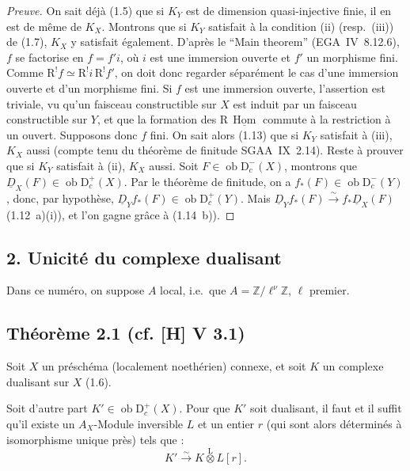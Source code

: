 \documentclass[11pt]{article}
\DeclareMathOperator{\Hom}{Hom}
\newcommand{\R}{\mathrm{R}}\newcommand{\RHomCore}{\mathrm{RHom}}
\newcommand{\D}{\mathrm{D}}
\newcommand{\Z}{\mathbb{Z}}
\newcommand{\ob}{\operatorname{ob}}
\providecommand{\Hom}{\operatorname{Hom}}
\providecommand{\ob}{\operatorname{ob}}
\providecommand{\R}{\mathrm R}
\providecommand{\Z}{\mathbb Z}
\providecommand{\Hom}{\operatorname{Hom}}
\begin{document}
\begin{proof}[Preuve]
On sait déjà (1.5) que si $K_Y$ est de dimension quasi-injective finie, il en est de même de $K_X$. Montrons que si $K_Y$ satisfait à la condition (ii) (resp.~(iii)) de (1.7), $K_X$ y satisfait également. D'après le ``Main theorem'' (EGA~IV~8.12.6), $f$ se factorise en $f = f'i$, où $i$ est une immersion ouverte et $f'$ un morphisme fini. Comme $\R^{!}f \simeq \R^{!}i \, \R^{!}f'$, on doit donc regarder séparément le cas d'une immersion ouverte et d'un morphisme fini. Si $f$ est une immersion ouverte, l'assertion est triviale, vu qu'un faisceau constructible sur $X$ est induit par un faisceau constructible sur $Y$, et que la formation des $\R\,\underline{\Hom}$ commute à la restriction à un ouvert. Supposons donc $f$ fini. On sait alors (1.13) que si $K_Y$ satisfait à (iii), $K_X$ aussi (compte tenu du théorème de finitude SGAA~IX~2.14). Reste à prouver que si $K_Y$ satisfait à (ii), $K_X$ aussi. Soit $F \in \ob \D_c^{-}(X)$, montrons que $\underline{D}_X(F) \in \ob \D_c^{+}(X)$. Par le théorème de finitude, on a $f_{*}(F) \in \ob \D_c^{-}(Y)$, donc, par hypothèse, $\underline{D}_Y f_{*}(F) \in \ob \D_c^{+}(Y)$. Mais $\underline{D}_Y f_{*}(F) \xrightarrow{\sim} f_{*}\underline{D}_X(F)$ (1.12~a)(i)), et l'on gagne grâce à (1.14~b)).
\end{proof}

\subsection{2. Unicité du complexe dualisant}

Dans ce numéro, on suppose $A$ local, i.e.~que $A = \Z/\ell^{\nu}\Z$, $\ell$ premier.

\subsection*{Théorème 2.1 (cf. [H] V 3.1)}
Soit $X$ un préschéma (localement noethérien) connexe, et soit $K$ un complexe dualisant sur $X$ (1.6).

Soit d'autre part $K' \in \ob \D_c^{+}(X)$. Pour que $K'$ soit dualisant, il faut et il suffit qu'il existe un $A_X$-Module inversible $L$ et un entier $r$ (qui sont alors déterminés à isomorphisme unique près) tels que :
\[
K' \xrightarrow{\sim} K \mathop{\otimes}\limits^{\mathrm{L}} L[r].
\]
\end{document}
